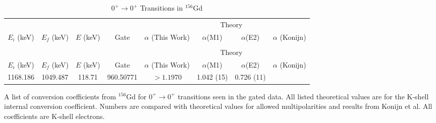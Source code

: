 \begin{landscape}
    \begin{longtable}{c|c|c|c|c|c|c|c}
        \caption{$0^+\rightarrow 0^+$ Transitions in $^{156}$Gd}
        \label{tab:156Gd_0_to_0}\\
        \toprule
        &	& 	&  &	& \multicolumn{2}{c|}{Theory}	& 	\\
        $E_i$ (keV)	&	$E_f$ (keV)	& $E$ (keV)	&	Gate &		$\alpha$ (This Work)	& $\alpha$(M1) & $\alpha$(E2) &	$\alpha$ (Konijn)	\\
        \hline
        \endfirsthead
        \toprule
        \caption[]{$0^+\rightarrow 0^+$ Transitions in $^{156}$Gd}\\
        &	& 	&  &	& \multicolumn{2}{c|}{Theory}	& 	\\
        $E_i$ (keV)	&	$E_f$ (keV)	& $E$ (keV)	&	Gate &		$\alpha$ (This Work)	& $\alpha$(M1) & $\alpha$(E2) &	$\alpha$ (Konijn)	\\
	    \endhead
        1168.186 & 1049.487  & 118.71 &  960.50771 & $>1.1970$ & 1.042 (15) & 0.726 (11) & \\
        \bottomrule
    \end{longtable}
    \caption{A list of conversion coefficients from $^{156}$Gd for $0^+\rightarrow 0^+$ transitions seen in the gated data. All listed theoretical values are for the K-shell internal conversion coefficient. Numbers are compared with theoretical values for allowed multipolarities and results from Konijn et al.\citep{konjin81:_156gd} All coefficients are K-shell electrons.}
\end{landscape}